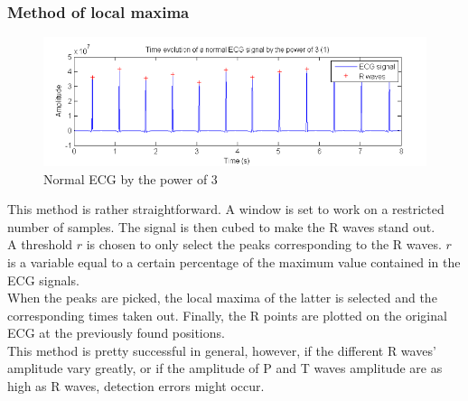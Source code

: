 \documentclass[11pt]{article}
\begin{document}
		\subsubsection{Method of local maxima}
			\begin{figure}[ht]
				\centering
				\includegraphics[scale=0.5]{images/Q411_lm.png}
				\caption{Normal ECG by the power of 3}
				\label{Q411_lm}
			\end{figure}
			This method is rather straightforward. A window is set to work on a restricted number of samples. The signal is then cubed to make the R waves stand out.\\
			A threshold $r$ is chosen to only select the peaks corresponding to the R waves. $r$ is a variable equal to a certain percentage of the maximum value contained in the ECG signals.\\
			When the peaks are picked, the local maxima of the latter is selected and the corresponding times taken out. Finally, the R points are plotted on the original ECG at the previously found positions.\\
			This method is pretty successful in general, however, if the different R waves' amplitude vary greatly, or if the amplitude of P and T waves amplitude are as high as R waves, detection errors might occur.
\end{document}
